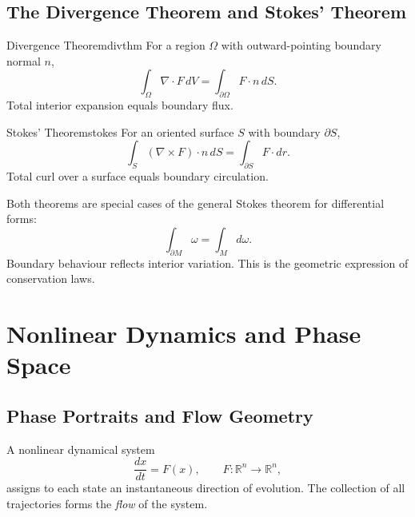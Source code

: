 \documentclass[12pt,openany]{book}
\newcommand{\R}{\mathbb{R}}
\begin{document}
\section{The Divergence Theorem and Stokes' Theorem}

\begin{theorem}{Divergence Theorem}{divthm}
  For a region $\Omega$ with outward-pointing boundary normal $n$,
  \[
    \int_\Omega \nabla\cdot F\,dV
    = \int_{\partial\Omega} F\cdot n\,dS.
  \]
  Total interior expansion equals boundary flux.
\end{theorem}

\begin{theorem}{Stokes' Theorem}{stokes}
  For an oriented surface $S$ with boundary $\partial S$,
  \[
    \int_S (\nabla\times F)\cdot n\,dS
    = \int_{\partial S} F\cdot dr.
  \]
  Total curl over a surface equals boundary circulation.
\end{theorem}

Both theorems are special cases of the general Stokes theorem for differential
forms:
\[
  \int_{\partial M} \omega = \int_M d\omega.
\]
Boundary behaviour reflects interior variation. This is the geometric
expression of conservation laws.

\chapter{Nonlinear Dynamics and Phase Space}
\label{ch:nonlinear}

\section{Phase Portraits and Flow Geometry}

A nonlinear dynamical system
\[
  \frac{dx}{dt} = F(x), \qquad F:\R^n\to\R^n,
\]
assigns to each state an instantaneous direction of evolution. The collection
of all trajectories forms the \emph{flow} of the system.
\end{document}
